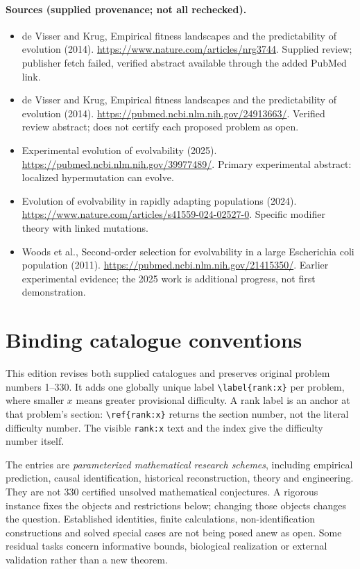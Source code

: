 \documentclass[11pt]{article}
\begin{document}
\paragraph{Sources (supplied provenance; not all rechecked).}
\begin{itemize}
\item de Visser and Krug, Empirical fitness landscapes and the predictability of evolution (2014). \url{https://www.nature.com/articles/nrg3744}. Supplied review; publisher fetch failed, verified abstract available through the added PubMed link.
\item de Visser and Krug, Empirical fitness landscapes and the predictability of evolution (2014). \url{https://pubmed.ncbi.nlm.nih.gov/24913663/}. Verified review abstract; does not certify each proposed problem as open.
\item Experimental evolution of evolvability (2025). \url{https://pubmed.ncbi.nlm.nih.gov/39977489/}. Primary experimental abstract: localized hypermutation can evolve.
\item Evolution of evolvability in rapidly adapting populations (2024). \url{https://www.nature.com/articles/s41559-024-02527-0}. Specific modifier theory with linked mutations.
\item Woods et al., Second-order selection for evolvability in a large Escherichia coli population (2011). \url{https://pubmed.ncbi.nlm.nih.gov/21415350/}. Earlier experimental evidence; the 2025 work is additional progress, not first demonstration.
\end{itemize}


\section*{Binding catalogue conventions}
This edition revises both supplied catalogues and preserves original problem numbers 1--330. It adds one globally unique label \verb|\label{rank:x}| per problem, where smaller $x$ means greater provisional difficulty. A rank label is an anchor at that problem's section: \verb|\ref{rank:x}| returns the section number, not the literal difficulty number. The visible \texttt{rank:x} text and the index give the difficulty number itself.

The entries are \emph{parameterized mathematical research schemes}, including empirical prediction, causal identification, historical reconstruction, theory and engineering. They are not 330 certified unsolved mathematical conjectures. A rigorous instance fixes the objects and restrictions below; changing those objects changes the question. Established identities, finite calculations, non-identification constructions and solved special cases are not being posed anew as open. Some residual tasks concern informative bounds, biological realization or external validation rather than a new theorem.
\end{document}
